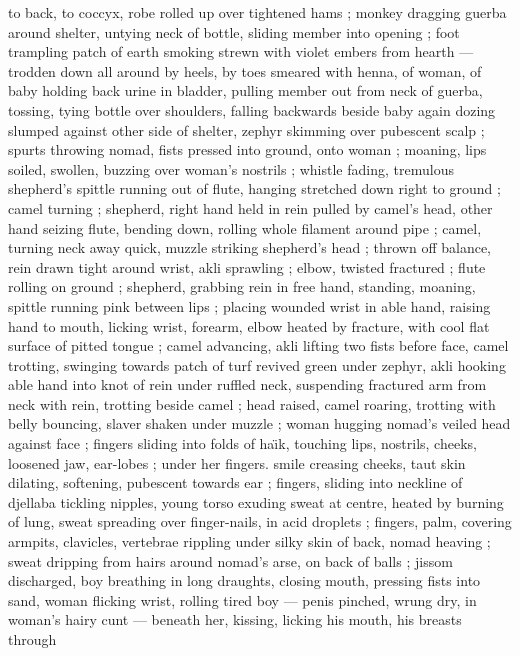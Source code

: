 to back, to coccyx, robe rolled up over tightened hams ; monkey 
dragging guerba around shelter, untying neck of bottle, sliding 
member into opening ; foot trampling patch of earth smoking strewn 
with violet embers from hearth --- trodden down all around by heels, 
by toes smeared with henna, of woman, of baby {\dashcom} holding back 
urine in bladder, pulling member out from neck of guerba, tossing, 
tying bottle over shoulders, falling backwards beside baby again 
dozing slumped against other side of shelter, zephyr skimming over 
pubescent scalp ; spurts throwing nomad, fists pressed into ground, 
onto woman ; moaning, lips soiled, swollen, buzzing over woman's 
nostrils ; whistle fading, tremulous {\col} shepherd's spittle running out 
of flute, hanging stretched down right to ground ; camel turning ; 
shepherd, right hand held in rein pulled by camel's head, other hand 
seizing flute, bending down, rolling whole filament around pipe ; 
camel, turning neck away quick, muzzle striking shepherd's head ; 
thrown off balance, rein drawn tight around wrist, akli sprawling ; 
elbow, twisted {\col} fractured ; flute rolling on ground ; shepherd, 
grabbing rein in free hand, standing, moaning, spittle running pink 
between lips ; placing wounded wrist in able hand, raising hand to 
mouth, licking wrist, forearm, elbow heated by fracture, with cool flat 
surface of pitted tongue ; camel advancing, akli lifting two fists 
before face, camel trotting, swinging towards patch of turf revived 
green under zephyr, akli hooking able hand into knot of rein under 
ruffled neck, suspending fractured arm from neck with rein, trotting 
beside camel ; head raised, camel roaring, trotting with belly 
bouncing, slaver shaken under muzzle ; woman hugging nomad's 
veiled head against face ; fingers sliding into folds of ha\"{\i}k, touching 
lips, nostrils, cheeks, loosened jaw, ear-lobes ; under her fingers. 
smile creasing cheeks, taut skin dilating, softening, pubescent 
towards ear ; fingers, sliding into neckline of djellaba tickling 
nipples, young torso exuding sweat at centre, heated by burning of 
lung, sweat spreading over finger-nails, in acid droplets ; fingers, 
palm, covering armpits, clavicles, vertebrae rippling under silky skin 
of back, nomad heaving ; sweat dripping from hairs around nomad's 
arse, on back of balls ; jissom discharged, boy breathing in long 
draughts, closing mouth, pressing fists into sand, woman flicking 
wrist, rolling tired boy --- penis pinched, wrung dry, in woman's hairy 
cunt --- beneath her, kissing, licking his mouth, his breasts through 
